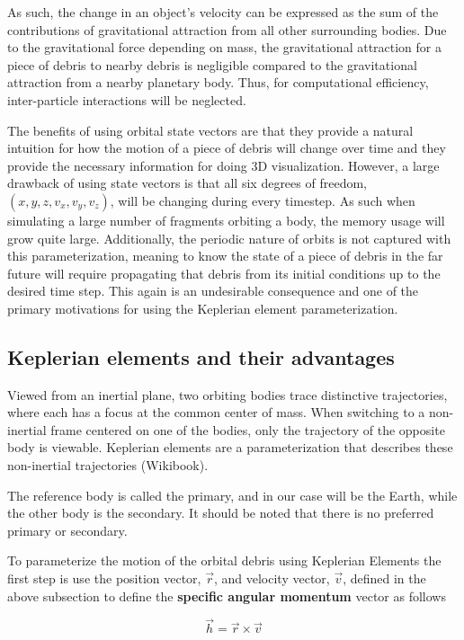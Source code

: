 \documentclass{article}
\newcommand{\boldindex}[1]{%
	\textbf{#1}\index{#1}%
}
\begin{document}
As such, the change in an object's velocity can be expressed as the sum of the contributions of gravitational attraction from all other surrounding bodies. Due to the gravitational force depending on mass, the gravitational attraction for a piece of debris to nearby debris is negligible compared to the gravitational attraction from a nearby planetary body. Thus, for computational efficiency, inter-particle interactions will be neglected.

The benefits of using orbital state vectors are that they provide a natural intuition for how the motion of a piece of debris will change over time and they provide the necessary information for doing 3D visualization. However, a large drawback of using state vectors is that all six degrees of freedom, $ (x, y, z, v_x, v_y, v_z)$, will be changing during every timestep. As such when simulating a large number of fragments orbiting a body, the memory usage will grow quite large. Additionally, the periodic nature of orbits is not captured with this parameterization, meaning to know the state of a piece of debris in the far future will require propagating that debris from its initial conditions up to the desired time step. This again is an undesirable consequence and one of the primary motivations for using the Keplerian element parameterization.
 
\newpage
\subsection{Keplerian elements and their advantages}

Viewed from an inertial plane, two orbiting bodies trace distinctive trajectories, where each has a focus at the common center of mass. When switching to a non-inertial frame centered on one of the bodies, only the trajectory of the opposite body is viewable. Keplerian elements are a parameterization that describes these non-inertial trajectories (Wikibook).

The reference body is called the primary, and in our case will be the Earth, while the other body is the secondary. It should be noted that there is no preferred primary or secondary.

To parameterize the motion of the orbital debris using Keplerian Elements the first step is use the position vector, $\vec{r}$, and velocity vector, $\vec{v}$, defined in the above subsection to define the \boldindex{specific angular momentum} vector as follows

\begin{equation}
\vec{h} = \vec{r} \times \vec{v}
\end{equation}
\end{document}
